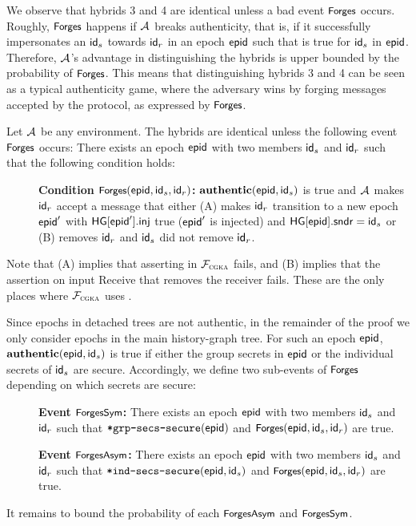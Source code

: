 We observe that hybrids 3 and 4 are identical unless a bad event $\forges$ occurs. Roughly, $\forges$ happens if $\Adv$ breaks authenticity, that is, if it successfully impersonates an $\id_s$ towards $\id_r$ in an epoch $\hgnodeid$ such that \KwAuth{} is true for $\id_s$ in $\hgnodeid$. Therefore, $\Adv$'s advantage in distinguishing the hybrids is upper bounded by the probability of $\forges$. This means that distinguishing hybrids 3 and 4 can be seen as a typical authenticity game, where the adversary wins by forging messages accepted by the protocol, as expressed by $\forges$.

Let $\Adv$ be any environment. The hybrids are identical unless the following event $\forges$ occurs: There exists an epoch $\hgnodeid$ with two members $\id_s$ and $\id_r$ such that the following condition holds:
\begin{description}
  \item[] {\bf Condition $\forges(\hgnodeid, \id_s, \id_r)$: } $\KwAuth{}(\hgnodeid, \id_s)$ is true and $\Adv$ makes $\id_r$ accept a message that either (A) makes $\id_r$ transition to a new epoch $\hgnodeid'$ with $\hg[\hgnodeid'].\hginj$ true ($\hgnodeid'$ is injected) and $\hg[\hgnodeid].\hgorig=\id_s$ or (B) removes $\id_r$ and $\id_s$ did not remove $\id_r$.
\end{description}
Note that (A) implies that asserting \authPreserved in $\funcCGKA$ fails, and (B) implies that the assertion on input Receive that removes the receiver fails. These are the only places where $\funcCGKA$ uses \KwAuth{}.

Since epochs in detached trees are not authentic, in the remainder of the proof we only consider epochs in the main history-graph tree. For such an epoch $\hgnodeid$, $\KwAuth{}(\hgnodeid, \id_s)$ is true if either the group secrets in $\hgnodeid$ or the individual secrets of $\id_s$ are secure. Accordingly, we define two sub-events of $\forges$ depending on which secrets are secure:
\begin{description}
  \item[] {\bf Event $\forgess$: } There exists an epoch $\hgnodeid$ with two members $\id_s$ and $\id_r$ such that $\safeGrpSecsSecure(\hgnodeid)$ and $\forges(\hgnodeid, \id_s, \id_r)$ are true.
  \item[] {\bf Event $\forgesa$: } There exists an epoch $\hgnodeid$ with two members $\id_s$ and $\id_r$ such that $\safeIndSecsSecure(\hgnodeid, \id_s)$ and $\forges(\hgnodeid, \id_s, \id_r)$ are true.
\end{description}
It remains to bound the probability of each $\forgesa$ and $\forgess$.

